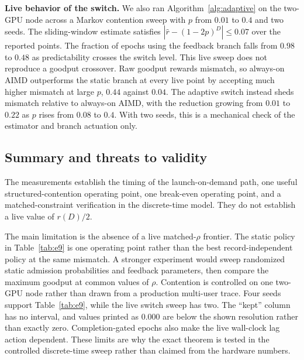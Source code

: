 \noindent\textbf{Live behavior of the switch.}
We also ran Algorithm~\ref{alg:adaptive} on the two-GPU node across a Markov
contention sweep with $p$ from $0.01$ to $0.4$ and two seeds. The sliding-window
estimate satisfies $|\hat r-(1-2p)^D|\le0.07$ over the reported points. The
fraction of epochs using the feedback branch falls from $0.98$ to $0.48$ as
predictability crosses the switch level. This live sweep does not reproduce a
goodput crossover. Raw goodput rewards mismatch, so always-on AIMD outperforms
the static branch at every live point by accepting much higher mismatch at large
$p$, $0.44$ against $0.04$. The adaptive switch instead sheds mismatch relative
to always-on AIMD, with the reduction growing from $0.01$ to $0.22$ as $p$ rises
from $0.08$ to $0.4$. With two seeds, this is a mechanical check of the estimator
and branch actuation only.

\subsection{Summary and threats to validity}
\label{sec:eval-threats}
The measurements establish the timing of the launch-on-demand path, one useful
structured-contention operating point, one break-even operating point, and a
matched-constraint verification in the discrete-time model. They do not establish
a live value of $r(D)/2$.

The main limitation is the absence of a live matched-$\rho$ frontier. The static
policy in Table~\ref{tab:e9} is one operating point rather than the best
record-independent policy at the same mismatch. A stronger experiment would
sweep randomized static admission probabilities and feedback parameters, then
compare the maximum goodput at common values of $\rho$. Contention is controlled
on one two-GPU node rather than drawn from a production multi-user trace. Four
seeds support Table~\ref{tab:e9}, while the live switch sweep has two. The
``kept'' column has no interval, and values printed as $0.000$ are below the shown
resolution rather than exactly zero. Completion-gated epochs also make the live
wall-clock lag action dependent. These limits are why the exact theorem is tested
in the controlled discrete-time sweep rather than claimed from the hardware
numbers.
